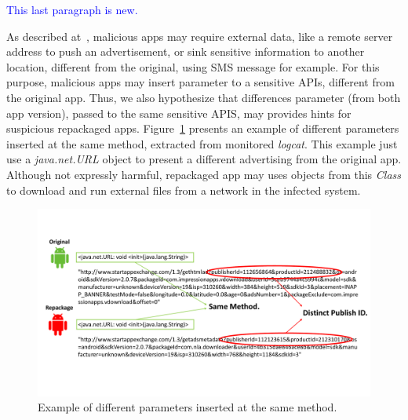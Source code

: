 \textcolor{blue}{This last paragraph is new.}

As described at~\cite{le2018towards}, malicious apps may require external data, like a remote server address to push an advertisement, or sink sensitive information to another location, different from the original, using SMS message for example. For this purpose, malicious apps may insert parameter to a sensitive APIs, different from the original app. Thus, we also hypothesize that differences parameter (from both app version), passed to the same sensitive APIS, may provides hints for suspicious repackaged apps. Figure~\ref{fig:parameterDiff} presents an example of different parameters inserted at the same method, extracted from monitored \textit{logcat}. This example just use a \textit{java.net.URL} object to present a different advertising from the original app. Although not expressly harmful, repackaged app may uses objects from this \textit{Class} to download and run external files from a network in the infected system\cite{DBLP:journals/compsec/ObaidatSPP22}.



\begin{figure}[t]
\centering
\includegraphics[scale=0.3]{images/parameterDiff.pdf}
\caption{Example of different parameters inserted at the same method.}
 \label{fig:parameterDiff}
\end{figure}





